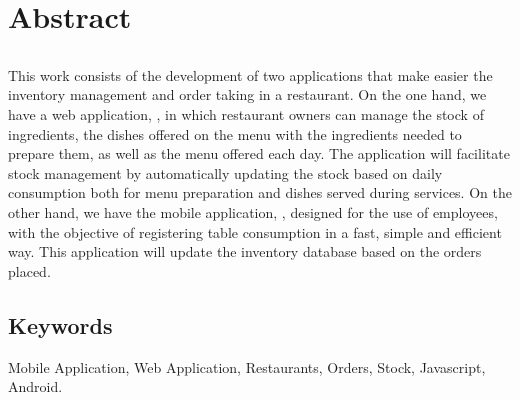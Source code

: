\chapter*{Abstract}

\section*{\tituloPortadaEngVal}

This work consists of the development of two applications that make easier the inventory management and order taking in a restaurant. On the one hand, we have a web application, \appadm, in which restaurant owners can manage the stock of ingredients, the dishes offered on the menu with the ingredients needed to prepare them, as well as the menu offered each day. The application will facilitate stock management by automatically updating the stock based on daily consumption both for menu preparation and dishes served during services.
On the other hand, we have the mobile application, \appweb, designed for the use of employees, with the objective of registering table consumption in a fast, simple and efficient way. This application will update the inventory database based on the orders placed.


\section*{Keywords}

\noindent Mobile Application, Web Application, Restaurants, Orders, Stock, Javascript, Android.



